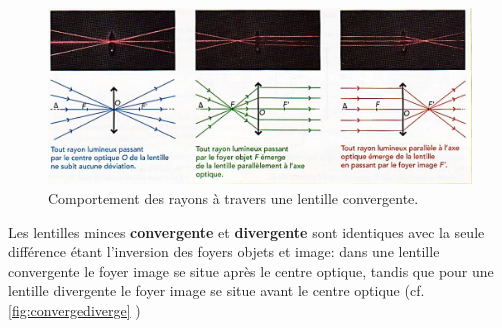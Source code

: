 \documentclass[11pt,a4paper]{article}
\begin{document}
\begin{figure}[H]
    \centering
    \includegraphics[width=\textwidth]{imgs/p6/rayons.jpg}
    \caption{Comportement des rayons à travers une lentille convergente.}
    \label{fig:rayonsconvergent}
\end{figure}

Les lentilles minces \textbf{convergente} et \textbf{divergente} sont identiques avec la seule différence étant l'inversion des foyers objets et image: dans une lentille convergente le foyer image se situe après le centre optique, tandis que pour une lentille divergente le foyer image se situe avant le centre optique (cf. \ref{fig:convergediverge} )
\end{document}
